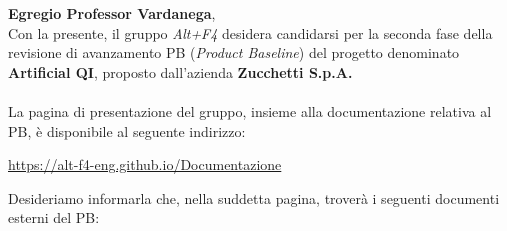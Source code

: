 \documentclass[a4paper, 12pt]{article}
\begin{document}
\primapagina

\newpage

\noindent
\textbf{Egregio Professor Vardanega}, \\
Con la presente, il gruppo \textit{Alt+F4} desidera candidarsi per la seconda fase della revisione di avanzamento PB (\textit{Product Baseline}) del progetto denominato \textbf{Artificial QI}, proposto dall'azienda \textbf{Zucchetti S.p.A.}\\
\\
La pagina di presentazione del gruppo, insieme alla documentazione relativa al PB, è disponibile al seguente indirizzo: 
\begin{center}
    \href{https://alt-f4-eng.github.io/Documentazione}{https://alt-f4-eng.github.io/Documentazione}\\
\end{center}
Desideriamo informarla che, nella suddetta pagina, troverà i seguenti documenti esterni del PB:
\end{document}

